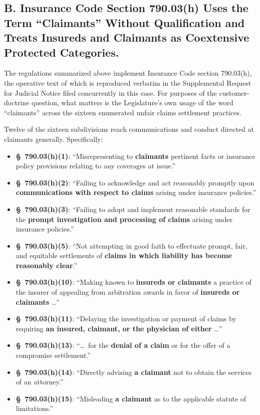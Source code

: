 \subsection*{B. Insurance Code Section 790.03(h) Uses the Term ``Claimants'' Without Qualification and Treats Insureds and Claimants as Coextensive Protected Categories.}

The regulations summarized above implement Insurance Code section 790.03(h), the operative text of which is reproduced verbatim in the Supplemental Request for Judicial Notice filed concurrently in this case. For purposes of the customer-doctrine question, what matters is the Legislature's own usage of the word ``claimants'' across the sixteen enumerated unfair claims settlement practices.

Twelve of the sixteen subdivisions reach communications and conduct directed at claimants generally. Specifically:

\begin{itemize}
\tightlist
\item \textbf{\S~790.03(h)(1)}: ``Misrepresenting to \textbf{claimants} pertinent facts or insurance policy provisions relating to any coverages at issue.''
\item \textbf{\S~790.03(h)(2)}: ``Failing to acknowledge and act reasonably promptly upon \textbf{communications with respect to claims} arising under insurance policies.''
\item \textbf{\S~790.03(h)(3)}: ``Failing to adopt and implement reasonable standards for the \textbf{prompt investigation and processing of claims} arising under insurance policies.''
\item \textbf{\S~790.03(h)(5)}: ``Not attempting in good faith to effectuate prompt, fair, and equitable settlements of \textbf{claims in which liability has become reasonably clear}.''
\item \textbf{\S~790.03(h)(10)}: ``Making known to \textbf{insureds or claimants} a practice of the insurer of appealing from arbitration awards in favor of \textbf{insureds or claimants} \dots''
\item \textbf{\S~790.03(h)(11)}: ``Delaying the investigation or payment of claims by requiring \textbf{an insured, claimant, or the physician of either} \dots''
\item \textbf{\S~790.03(h)(13)}: ``\dots~for the \textbf{denial of a claim} or for the offer of a compromise settlement.''
\item \textbf{\S~790.03(h)(14)}: ``Directly advising \textbf{a claimant} not to obtain the services of an attorney.''
\item \textbf{\S~790.03(h)(15)}: ``Misleading \textbf{a claimant} as to the applicable statute of limitations.''
\end{itemize}

